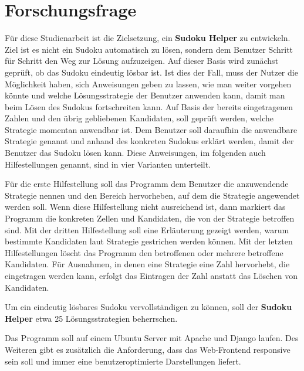 \section{Forschungsfrage}
Für diese Studienarbeit ist die Zielsetzung, ein \textbf{Sudoku Helper} zu entwickeln. Ziel ist es nicht ein Sudoku automatisch zu lösen, sondern dem Benutzer Schritt für Schritt den Weg zur Lösung aufzuzeigen. Auf dieser Basis wird zunächst geprüft, ob das Sudoku eindeutig lösbar ist. Ist dies der Fall, muss der Nutzer die Möglichkeit haben, sich Anweisungen geben zu lassen, wie man weiter vorgehen könnte und welche Lösungsstrategie der Benutzer anwenden kann, damit man beim Lösen des Sudokus fortschreiten kann. Auf Basis der bereits eingetragenen Zahlen und den übrig gebliebenen Kandidaten, soll geprüft werden, welche Strategie momentan anwendbar ist. Dem Benutzer soll daraufhin die anwendbare Strategie genannt und anhand des konkreten Sudokus erklärt werden, damit der Benutzer das Sudoku lösen kann. Diese Anweisungen, im folgenden auch Hilfestellungen genannt, sind in vier Varianten unterteilt.

Für die erste Hilfestellung soll das Programm dem Benutzer die anzuwendende Strategie nennen und den Bereich hervorheben, auf dem die Strategie angewendet werden soll. Wenn diese Hilfestellung nicht ausreichend ist, dann markiert das Programm die konkreten Zellen und Kandidaten, die von der Strategie betroffen sind. Mit der dritten Hilfestellung soll eine Erläuterung gezeigt werden, warum bestimmte Kandidaten laut Strategie gestrichen werden können. Mit der letzten Hilfestellungen löscht das Programm den betroffenen oder mehrere betroffene Kandidaten. Für Ausnahmen, in denen eine Strategie eine Zahl hervorhebt, die eingetragen werden kann, erfolgt das Eintragen der Zahl anstatt das Löschen von Kandidaten.

Um ein eindeutig lösbares Sudoku vervollständigen zu können, soll der \textbf{Sudoku Helper} etwa 25 Lösungsstrategien beherrschen.

Das Programm soll auf einem Ubuntu Server mit Apache und Django laufen. Des Weiteren gibt es zusätzlich die Anforderung, dass das Web-Frontend responsive sein soll und immer eine benutzeroptimierte Darstellungen liefert.